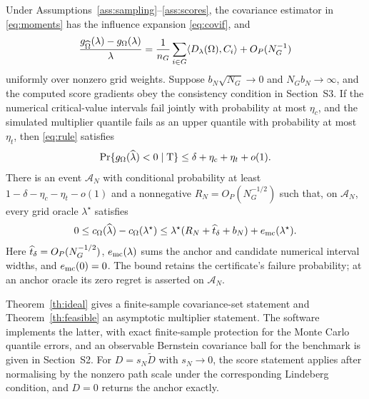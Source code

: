 \begin{theorem}\label{th:feasible}
Under Assumptions~\ref{ass:sampling}--\ref{ass:scores}, the covariance estimator in \eqref{eq:moments} has the influence expansion \eqref{eq:covif}, and
\begin{equation}\label{eq:slopelinear}
 \frac{g_{\widehat\Omega}(\lambda)-g_\Omega(\lambda)}{\lambda}
   =\frac1{n_G}\sum_{i\in G}\langle D_\lambda(\Omega),C_i\rangle
     +O_P(N_G^{-1})
\end{equation}
uniformly over nonzero grid weights. Suppose $b_N\sqrt{N_G}\to0$ and $N_Gb_N\to\infty$, and the computed score gradients obey the consistency condition in Section~S3. If the numerical critical-value intervals fail jointly with probability at most $\eta_c$, and the simulated multiplier quantile fails as an upper quantile with probability at most $\eta_t$, then \eqref{eq:rule} satisfies
\begin{equation}\label{eq:asympsafety}
 \Pr\{g_\Omega(\widehat\lambda)<0\mid\mathrm{T}\}
       \leq\delta+\eta_c+\eta_t+o(1).
\end{equation}
There is an event $\mathcal A_N$ with conditional probability at least
$1-\delta-\eta_c-\eta_t-o(1)$ and a nonnegative $R_N=O_P(N_G^{-1/2})$ such that, on $\mathcal A_N$, every grid oracle $\lambda^\star$ satisfies
\begin{equation}\label{eq:feasible-regret}
 0\leq c_\Omega(\widehat\lambda)-c_\Omega(\lambda^\star)
 \leq\lambda^\star(R_N+\widehat t_\delta+b_N)+e_{\mathrm{mc}}(\lambda^\star).
\end{equation}
Here $\widehat t_\delta=O_P(N_G^{-1/2})$, $e_{\mathrm{mc}}(\lambda)$ sums the anchor and candidate numerical interval widths, and $e_{\mathrm{mc}}(0)=0$. The bound retains the certificate's failure probability; at an anchor oracle its zero regret is asserted on $\mathcal A_N$.
\end{theorem}

\begin{remark}\label{rem:calibrations}
Theorem~\ref{th:ideal} gives a finite-sample covariance-set statement and Theorem~\ref{th:feasible} an asymptotic multiplier statement. The software implements the latter, with exact finite-sample protection for the Monte Carlo quantile errors, and an observable Bernstein covariance ball for the benchmark is given in Section~S2. For $D=s_N\widetilde D$ with $s_N\to0$, the score statement applies after normalising by the nonzero path scale under the corresponding Lindeberg condition, and $D=0$ returns the anchor exactly.
\end{remark}

